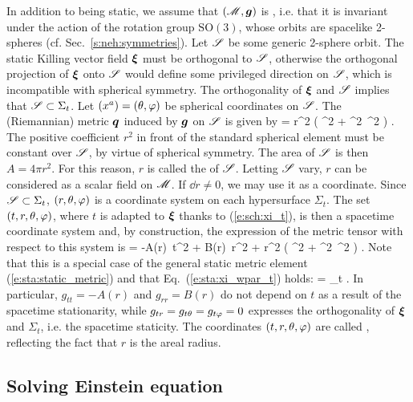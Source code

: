 In addition to being static, we assume that $(\mathscr{M},\bm{g})$ is ,
i.e. that it is invariant under the action of the rotation group $\mathrm{SO}(3)$,
whose orbits are spacelike 2-spheres (cf. Sec.~\ref{s:neh:symmetries}).
Let $\mathscr{S}$ be some generic 2-sphere orbit. The static Killing vector field $\bm{\xi}$
must be orthogonal to $\mathscr{S}$, otherwise the orthogonal projection of $\bm{\xi}$
onto $\mathscr{S}$ would define some privileged direction on $\mathscr{S}$, which is incompatible
with spherical symmetry. The orthogonality of $\bm{\xi}$ and $\mathscr{S}$ implies
that $\mathscr{S}\subset\Sigma_t$. Let $(x^a)=(\theta,\varphi)$ be spherical coordinates on
$\mathscr{S}$. The (Riemannian) metric $\bm{q}$ induced by $\bm{g}$ on $\mathscr{S}$ is given by
\be
     = r^2 \left( \dd\th^2 + \sin^2\th\, \dd\ph^2 \right) .
\ee
The positive coefficient $r^2$ in front of the standard spherical element must be
constant over $\mathscr{S}$, by virtue of spherical symmetry. The area of $\mathscr{S}$ is
then $A=4\pi r^2$. For this reason, $r$ is called the 
of $\mathscr{S}$. Letting $\mathscr{S}$ vary, $r$ can be considered as a scalar field on
$\mathscr{M}$. If $\dd r \not = 0$, we may use it as a coordinate. Since $\mathscr{S}\subset \Sigma_t$,
$(r,\theta,\varphi)$ is a coordinate system on each hypersurface $\Sigma_t$.
The set $(t,r,\theta,\varphi)$,
where $t$ is adapted to $\bm{\xi}$ thanks to (\ref{e:sch:xi_t}), is then a
spacetime coordinate system and, by construction, the expression of the metric tensor
with respect to this system is
\be \label{e:sch:g_AB}
     = -A(r)\, \dd t^2 + B(r)\, \dd r^2 +
        r^2 \left( \dd\th^2 + \sin^2\th\, \dd\ph^2 \right) .
\ee
Note that this is a special case of the general static metric element
(\ref{e:sta:static_metric}) and that Eq.~(\ref{e:sta:xi_wpar_t}) holds:
\be \label{e:sch:xi_wpar_t}
    \w{\xi} = \wpar_t .
\ee
In particular, $g_{tt} = -A(r)$ and $g_{rr} = B(r)$ do not depend on $t$
as a result of the spacetime stationarity, while
$g_{tr} = g_{t\theta} = g_{t\varphi} = 0$ expresses the orthogonality of $\bm{\xi}$
and $\Sigma_t$, i.e. the spacetime staticity.
The coordinates $(t,r,\theta,\varphi)$ are called ,
reflecting the fact that $r$ is the areal radius.

\subsection{Solving Einstein equation} \label{s:sch:solving_EE}

